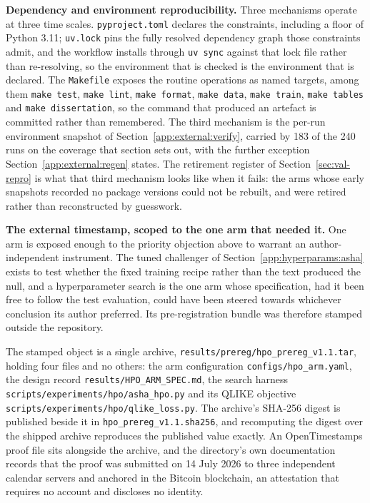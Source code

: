 \textbf{Dependency and environment reproducibility.} Three mechanisms operate at
three time scales. \texttt{pyproject.toml} declares the constraints, including a
floor of Python 3.11; \texttt{uv.lock} pins the fully resolved dependency graph
those constraints admit, and the workflow installs through \texttt{uv sync}
against that lock file rather than re-resolving, so the environment that is
checked is the environment that is declared. The \texttt{Makefile} exposes the
routine operations as named targets, among them \texttt{make test},
\texttt{make lint}, \texttt{make format}, \texttt{make data},
\texttt{make train}, \texttt{make tables} and \texttt{make dissertation}, so the
command that produced an artefact is committed rather than
remembered. %
The third mechanism is the per-run environment snapshot of
Section~\ref{app:external:verify}, carried by 183 of the 240 runs on the coverage
that section sets out, with the further exception Section~\ref{app:external:regen}
states. The retirement register of
Section~\ref{sec:val-repro} is what that third mechanism looks like when it
fails: the arms whose early snapshots recorded no package versions could not be
rebuilt, and were retired rather than reconstructed by guesswork.

\textbf{The external timestamp, scoped to the one arm that needed it.} One arm
is exposed enough to the priority objection above to warrant an
author-independent instrument.
The tuned challenger of Section~\ref{app:hyperparams:asha} exists to
test whether the fixed training recipe rather than the text produced the null,
and a hyperparameter search is the one arm whose specification, had it been
free to follow the test evaluation, could have been steered towards whichever
conclusion its author preferred. Its pre-registration bundle was therefore
stamped outside the repository.

The stamped object is a single archive,
\texttt{results/prereg/hpo\_prereg\_v1.1.tar}, holding four files and no others:
the arm configuration \texttt{configs/hpo\_arm.yaml}, the design record
\texttt{results/HPO\_ARM\_SPEC.md}, the search harness
\texttt{scripts/experiments/hpo/asha\_hpo.py} and its QLIKE objective
\texttt{scripts/experiments/hpo/qlike\_loss.py}. %
The archive's SHA-256 digest is published beside it in
\texttt{hpo\_prereg\_v1.1.sha256}, and recomputing the digest over the shipped
archive reproduces the published value
exactly. %
An OpenTimestamps proof file sits alongside the archive, and the directory's own
documentation records that the proof was submitted on 14 July 2026 to three
independent calendar servers and anchored in the Bitcoin blockchain, an
attestation that requires no account and discloses no
identity. %

